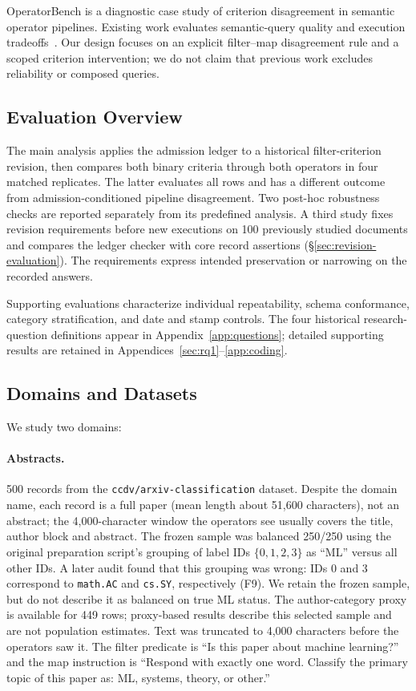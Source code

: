 \documentclass[11pt]{article}
\begin{document}
OperatorBench is a diagnostic case study of criterion disagreement
in semantic operator pipelines. Existing work evaluates semantic-query quality
and execution tradeoffs~\cite{lotus,sembench}. Our design focuses on an
explicit filter--map disagreement rule and a scoped criterion intervention;
we do not claim that previous work excludes reliability or composed queries.

\subsection{Evaluation Overview}
The main analysis applies the admission ledger to a historical filter-criterion
revision, then compares both binary criteria through both operators in four
matched replicates. The latter evaluates all rows and has a different outcome
from admission-conditioned pipeline disagreement. Two post-hoc robustness
checks are reported separately from its predefined analysis.
A third study fixes revision requirements before new executions on 100
previously studied documents and compares the ledger checker with core
record assertions (\S\ref{sec:revision-evaluation}). The requirements express
intended preservation or narrowing on the recorded answers.

Supporting evaluations characterize individual repeatability, schema
conformance, category stratification, and date and stamp controls. The four
historical research-question definitions appear in
Appendix~\ref{app:questions}; detailed supporting results are retained in
Appendices~\ref{sec:rq1}--\ref{app:coding}.

\subsection{Domains and Datasets}

We study two domains:

\paragraph{Abstracts.}
500 records from the \texttt{ccdv/arxiv-classification} dataset. Despite the
domain name, each record is a full paper (mean length about 51{,}600
characters), not an abstract; the 4{,}000-character window the operators see
usually covers the title, author block and abstract. The frozen
sample was balanced 250/250 using the original preparation script's grouping
of label IDs $\{0,1,2,3\}$ as ``ML'' versus all other IDs. A later audit
found that this grouping was wrong: IDs 0 and 3 correspond to \texttt{math.AC}
and \texttt{cs.SY}, respectively (F9). We retain the frozen sample, but do not
describe it as balanced on true ML status. The author-category proxy is
available for 449 rows; proxy-based results describe this selected sample and
are not population estimates. Text was truncated to 4{,}000 characters before
the operators saw it. The filter predicate is ``Is this paper about machine
learning?'' and the map instruction is ``Respond with exactly one word.
Classify the primary topic of this paper as: ML, systems, theory, or other.''
\end{document}
